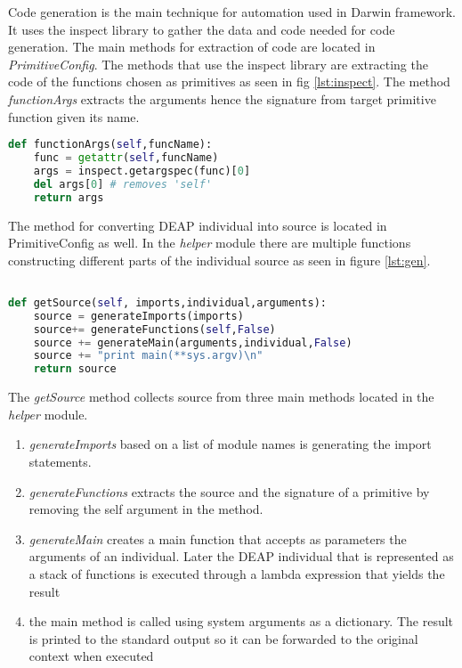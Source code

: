 Code generation is the main technique for automation used in Darwin framework. It uses
the inspect library to gather the data and code needed for code generation. The main methods
for extraction of code are located in \textit{PrimitiveConfig}. The methods that use the inspect library
are extracting the code of the functions chosen as primitives as seen in fig \ref{lst:inspect}.
The method \textit{functionArgs} extracts the arguments hence the signature from target primitive function
given its name.

\begin{lstlisting}[language=Python,caption={Function extracting the arguments of a primitive based on its name},label={lst:inspect}]
def functionArgs(self,funcName):
    func = getattr(self,funcName)
    args = inspect.getargspec(func)[0]
    del args[0] # removes 'self'
    return args
\end{lstlisting}

The method for converting DEAP individual into source is located in PrimitiveConfig as well. In the \textit{helper} module
there are multiple functions constructing different parts of the individual source as seen in figure \ref{lst:gen}.

\begin{lstlisting}[language=Python,caption={Function in PrimitiveConfig class that gathers source code parts of the individual},label={lst:gen}]

def getSource(self, imports,individual,arguments):
    source = generateImports(imports)
    source+= generateFunctions(self,False)
    source += generateMain(arguments,individual,False)
    source += "print main(**sys.argv)\n"
    return source
\end{lstlisting}

The \textit{getSource} method collects source from three main methods located in the \textit{helper} module.

\begin{enumerate}
\item \textit{generateImports} based on a list of module names is generating the import statements.

\item \textit{generateFunctions} extracts the source and the signature of a primitive by removing the self argument in the method. 
\item \textit{generateMain} creates a main function that accepts as parameters the arguments of an individual. Later the DEAP
individual that is represented as a stack of functions is executed through a lambda expression that yields the result
\item the main method is called using system arguments as a dictionary. The result is printed to the standard output
so it can be forwarded to the original context when executed
\end{enumerate}


